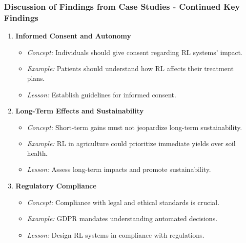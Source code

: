 \documentclass{beamer}
\begin{document}
\begin{frame}[fragile]
    \frametitle{Discussion of Findings from Case Studies - Continued Key Findings}
    \begin{enumerate}[resume]
        \item \textbf{Informed Consent and Autonomy}
            \begin{itemize}
                \item \textit{Concept:} Individuals should give consent regarding RL systems' impact.
                \item \textit{Example:} Patients should understand how RL affects their treatment plans.
                \item \textit{Lesson:} Establish guidelines for informed consent.
            \end{itemize}

        \item \textbf{Long-Term Effects and Sustainability}
            \begin{itemize}
                \item \textit{Concept:} Short-term gains must not jeopardize long-term sustainability.
                \item \textit{Example:} RL in agriculture could prioritize immediate yields over soil health.
                \item \textit{Lesson:} Assess long-term impacts and promote sustainability.
            \end{itemize}
        
        \item \textbf{Regulatory Compliance}
            \begin{itemize}
                \item \textit{Concept:} Compliance with legal and ethical standards is crucial.
                \item \textit{Example:} GDPR mandates understanding automated decisions.
                \item \textit{Lesson:} Design RL systems in compliance with regulations.
            \end{itemize}
    \end{enumerate}
\end{frame}
\end{document}
